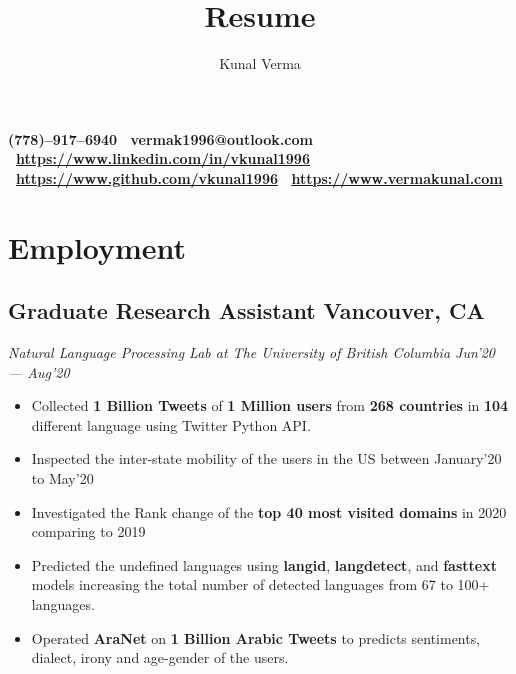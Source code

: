 \documentclass[a4paper,11pt]{article}
\makeatletter
\renewcommand{\maketitle}{
\begin{center}
{\huge\bfseries \uppercase
\theauthor}
\vspace{0em}
\end{center}
}
\makeatother
\begin{document}
\color{darkgray}
\title{Resume}
\author{Kunal Verma}
\maketitle
\begin{center}
    \bfseries {}\hspace{0.4em}(778)--917--6940 \textbullet\ \hspace{0.4em}vermak1996@outlook.com \textbullet\ \hspace{0.4em}\href {https://www.linkedin.com/in/vkunal1996}{https://www.linkedin.com/in/vkunal1996} \textbullet\ \hspace{0.4em}\href{https://www.github.com/vkunal1996}{https://www.github.com/vkunal1996} \textbullet\ \hspace{0.4em}\href{https://www.vermakunal.com}{https://www.vermakunal.com}
\end{center}
\section{Employment}
\subsection{Graduate Research Assistant \hspace{24em} Vancouver, CA}
\emph{Natural Language Processing Lab at The University of British Columbia \hspace{9.4em} Jun'20 --- Aug'20}
\begin{itemize}
    \item Collected \textbf{1 Billion Tweets} of \textbf{1 Million users} from \textbf{268 countries} in \textbf{104} different language using Twitter Python API.
    \item Inspected the inter-state mobility of the users in the US between January'20 to May'20
    \item Investigated the Rank change of the \textbf{top 40 most visited domains} in 2020 comparing to 2019
    \item Predicted the undefined languages using \textbf{langid}, \textbf{langdetect}, and \textbf{fasttext} models increasing the total number of detected languages from 67 to 100+ languages.
    \item Operated \textbf{AraNet} on \textbf{1 Billion Arabic Tweets} to predicts sentiments, dialect, irony and age-gender of the users.
\end{itemize}
\end{document}
